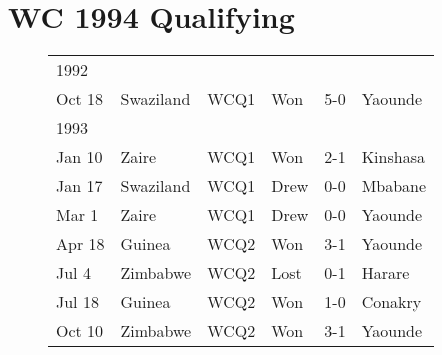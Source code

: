 \section{WC 1994 Qualifying}
\begin{figure}[H]
\begin{tabular}{l l c l c l}
1992 & & & & & \\
Oct 18 & Swaziland & WCQ1 & Won & 5-0 & Yaounde \\
1993 & & & & & \\
Jan 10 & Zaire & WCQ1 & Won & 2-1 & Kinshasa \\
Jan 17 & Swaziland & WCQ1 & Drew & 0-0 & Mbabane \\
Mar 1 & Zaire & WCQ1 & Drew & 0-0 & Yaounde \\
Apr 18 & Guinea & WCQ2 & Won & 3-1 & Yaounde \\
Jul 4 & Zimbabwe & WCQ2 & Lost & 0-1 & Harare \\
Jul 18 & Guinea & WCQ2 & Won & 1-0 & Conakry \\
Oct 10 & Zimbabwe & WCQ2 & Won  & 3-1 & Yaounde \\
\end{tabular}
\end{figure}
